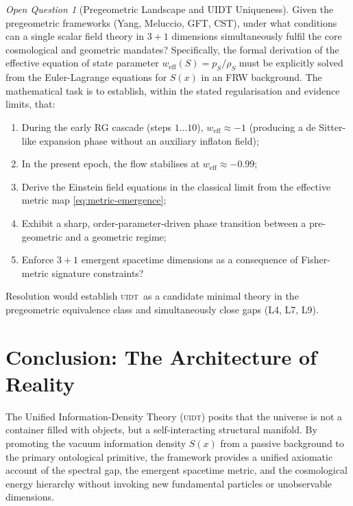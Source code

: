 \documentclass[12pt,a4paper,twoside]{article}
\theoremstyle{plain}
\theoremstyle{definition}
\theoremstyle{remark}
\newtheorem{openquestion}{Open Question}
\newcommand{\UIDT}{\textsc{uidt}}
\newcommand{\Sx}{S(x)}
\begin{document}
\begin{openquestion}[Pregeometric Landscape and UIDT Uniqueness]
\label{oq:4}
Given the pregeometric frameworks (Yang, Meluccio, GFT, CST), under what
conditions can a single scalar field theory in $3+1$ dimensions simultaneously
fulfil the core cosmological and geometric mandates? Specifically, the formal
derivation of the effective equation of state parameter $w_{\mathrm{eff}}(S) = p_S / \rho_S$
must be explicitly solved from the Euler-Lagrange equations for $S(x)$ in an
FRW background. The mathematical task is to establish, within the stated
regularisation and evidence limits, that:
\begin{enumerate}
  \item During the early RG cascade (steps $1\dots10$), $w_{\mathrm{eff}} \approx -1$
    (producing a de Sitter-like expansion phase without an auxiliary inflaton field);
  \item In the present epoch, the flow stabilises at $w_{\mathrm{eff}} \approx -0.99$;
  \item Derive the Einstein field equations in the classical limit
    from the effective metric map \eqref{eq:metric-emergence};
  \item Exhibit a sharp, order-parameter-driven phase transition between a
    pre-geometric and a geometric regime;
  \item Enforce $3+1$ emergent spacetime dimensions as a consequence of
    Fisher-metric signature constraints?
\end{enumerate}
Resolution would establish \UIDT\ as a candidate minimal theory in the
pregeometric equivalence class and simultaneously close gaps (L4, L7, L9).
\end{openquestion}

\newpage

\section{Conclusion: The Architecture of Reality}
\label{sec:conclusion}

The Unified Information-Density Theory (\UIDT) posits that the universe is not
a container filled with objects, but a self-interacting structural manifold.
By promoting the vacuum information density $\Sx$ from a passive background
to the primary ontological primitive, the framework provides a unified
axiomatic account of the spectral gap, the emergent spacetime metric, and the cosmological energy hierarchy
without invoking new fundamental particles or unobservable dimensions.
\end{document}
